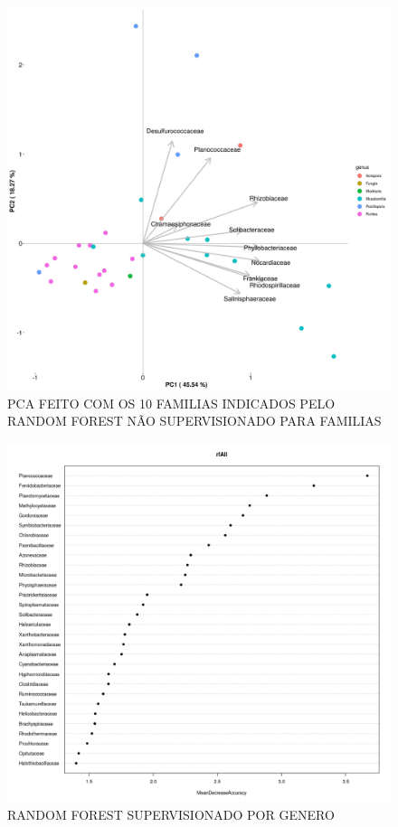 \documentclass[12pt, a4paper]{report}
\begin{document}
\begin{figure}[H]
\centering
\includegraphics[scale=0.3]{figures/familia/pca_corais_mgrast_rf_nao_supervisionado_10_familias_30_10_2018.jpg}
\caption{PCA FEITO COM OS 10 FAMILIAS INDICADOS PELO RANDOM FOREST NÃO SUPERVISIONADO PARA FAMILIAS}
\label{fig:PCAFEITOCOM10FAMILIAS}
\end{figure}

\begin{figure}[H]
\centering
\includegraphics[scale=0.3]{figures/familia/randomforest_supervisionado_genero_corais_mgrast_familia_leticia_2018_10_30.jpeg}
\caption{RANDOM FOREST SUPERVISIONADO POR GENERO}
\label{fig:RFSUPERVISIONADOGENEROPFAMILIAS}
\end{figure}
\end{document}
